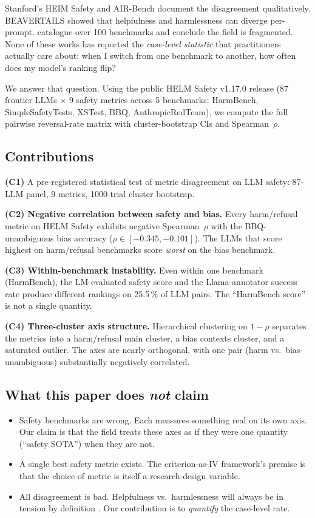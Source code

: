 \documentclass[10pt]{article}
\begin{document}
Stanford's HEIM Safety \citep{liang2024helm} and AIR-Bench
\citep{zeng2024airbench} document the disagreement qualitatively.
BEAVERTAILS \citep{ji2023beavertails} showed that helpfulness and
harmlessness can diverge per-prompt. \citet{liu2025scalesofjustitia}
catalogue over 100 benchmarks and conclude the field is fragmented.
None of these works has reported the \emph{case-level statistic}
that practitioners actually care about: when I switch from one
benchmark to another, how often does my model's ranking flip?

We answer that question. Using the public HELM Safety v1.17.0
release (87 frontier LLMs $\times$ 9 safety metrics across 5
benchmarks: HarmBench, SimpleSafetyTests, XSTest, BBQ,
AnthropicRedTeam), we compute the full pairwise reversal-rate matrix
with cluster-bootstrap CIs and Spearman~$\rho$.

\subsection{Contributions}

\textbf{(C1)} A pre-registered statistical test of metric
disagreement on LLM safety: 87-LLM panel, 9 metrics, 1000-trial
cluster bootstrap.

\textbf{(C2) Negative correlation between safety and bias.} Every
harm/refusal metric on HELM Safety exhibits negative
Spearman~$\rho$ with the BBQ-unambiguous bias accuracy
($\rho \in [-0.345, -0.101]$). The LLMs that score highest on
harm/refusal benchmarks score \emph{worst} on the bias benchmark.

\textbf{(C3) Within-benchmark instability.} Even within one
benchmark (HarmBench), the LM-evaluated safety score and the
Llama-annotator success rate produce different rankings on
25.5\,\% of LLM pairs. The ``HarmBench score'' is not a single
quantity.

\textbf{(C4) Three-cluster axis structure.} Hierarchical clustering
on $1 - \rho$ separates the metrics into a harm/refusal main
cluster, a bias contexts cluster, and a saturated outlier. The axes
are nearly orthogonal, with one pair (harm vs.\ bias-unambiguous)
substantially negatively correlated.

\subsection{What this paper does \emph{not} claim}

\begin{itemize}
\item Safety benchmarks are wrong. Each measures something real on
its own axis. Our claim is that the field treats these axes as if
they were one quantity (``safety SOTA'') when they are not.
\item A single best safety metric exists. The criterion-as-IV
framework's premise is that the choice of metric is itself a
research-design variable.
\item All disagreement is bad. Helpfulness vs.\ harmlessness will
always be in tension by definition \citep{bai2022constitutional}.
Our contribution is to \emph{quantify} the case-level rate.
\end{itemize}
\end{document}
